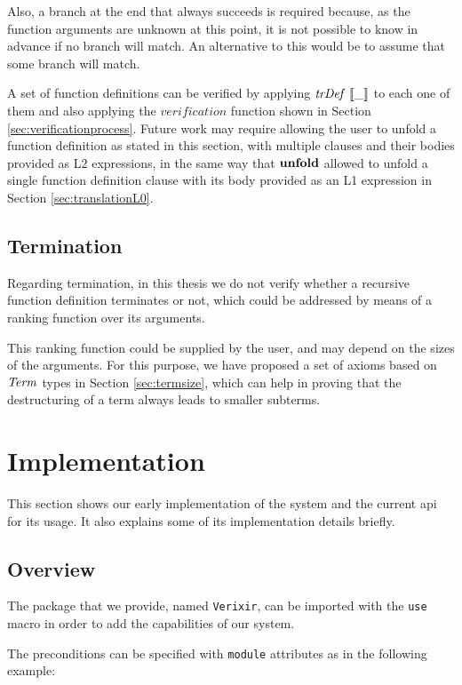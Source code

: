 Also, a branch at the end that always succeeds is required because, as the 
function arguments are unknown at this point, it is not possible to know in 
advance if no branch will match. An alternative to this would be to assume that
some branch will match.

A set of function definitions can be verified by applying $\mathit{trDef}~\llbracket\_\rrbracket$ to each
one of them and also applying the $\mathit{verification}$ function shown in
Section \ref{sec:verificationprocess}. Future work may require allowing the user
to unfold a function definition as stated in this section, with multiple clauses
and their bodies provided as L2 expressions, in the same way that $\textbf{unfold}$
allowed to unfold a single function definition clause with its body provided as
an L1 expression in Section \ref{sec:translationL0}.

\subsection{Termination}

Regarding termination, in this thesis we do not verify whether a recursive
function definition terminates or not, which could be addressed by means of a
ranking function over its arguments. 

This ranking function could be supplied by the user, and may depend on the sizes
of the arguments. For this purpose, we have proposed a set of axioms based on
$\mathit{Term}$ types in Section \ref{sec:termsize}, which can help in proving that the
destructuring of a term always leads to smaller subterms.

\section{Implementation}

This section shows our early implementation of the system and the current
\gls{api} for its usage. It also explains some of its implementation details 
briefly.

\subsection{Overview}

The package that we provide, named \verb|Verixir|, can be imported 
with the \verb|use| macro in order to add the capabilities of our system.

The preconditions can be specified with \verb|module| attributes as in the 
following example:

